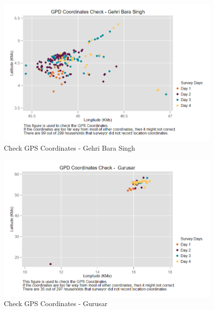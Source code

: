 \documentclass[9pt]{article}
\begin{document}
\begin{figure}[H]
	\centering
	\caption{Check GPS Coordinates - Gehri Bara Singh}
	\includegraphics[scale=0.50]{../4_figures/gps_check_pilot_1.png}
\end{figure}



\begin{figure}[H]
	\centering
	\caption{Check GPS Coordinates - Gurusar}
	\includegraphics[scale=0.50]{../4_figures/gps_check_pilot_2.png}
\end{figure}
\end{document}
